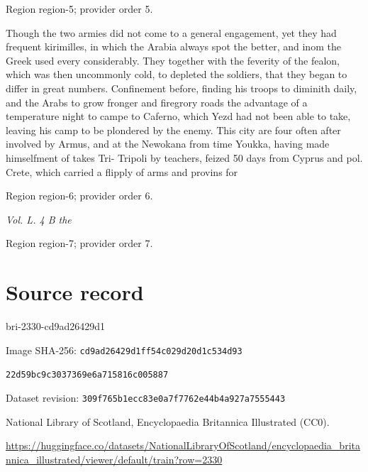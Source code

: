 \documentclass[11pt]{article}
\begin{document}
{\scriptsize\color{gray} Region region-5; provider order 5.\par}
\medskip

Though the two armies did not come to a general engagement, yet they had frequent kirimilles, in which the Arabia always spot the better, and inom the Greek used every considerably. They together with the feverity of the fealon, which was then uncommonly cold, to depleted the soldiers, that they began to differ in great numbers. Confinement before, finding his troops to diminith daily, and the Arabs to grow fronger and firegrory roads the advantage of a temperature night to campe to Caferno, which Yezd had not been able to take, leaving his camp to be plondered by the enemy. This city are four often after involved by Armus, and at the Newokana from time Youkka, having made himselfment of takes Tri- Tripoli by teachers, feized 50 days from Cyprus and pol. Crete, which carried a flipply of arms and provins for
\par

{\scriptsize\color{gray} Region region-6; provider order 6.\par}
\medskip

{\small\itshape Vol. L. 4 B the\par}

{\scriptsize\color{gray} Region region-7; provider order 7.\par}
\medskip
\newpage\section*{Source record}
bri-2330-cd9ad26429d1\par
Image SHA-256: \texttt{cd9ad26429d1ff54c029d20d1c534d93}\par\texttt{22d59bc9c3037369e6a715816c005887}\par
Dataset revision: \texttt{309f765b1ecc83e0a7f7}\texttt{762e44b4a927a7555443}\par
National Library of Scotland, Encyclopaedia Britannica Illustrated (CC0).\par
\url{https://huggingface.co/datasets/NationalLibraryOfScotland/encyclopaedia_britannica_illustrated/viewer/default/train?row=2330}
\end{document}
